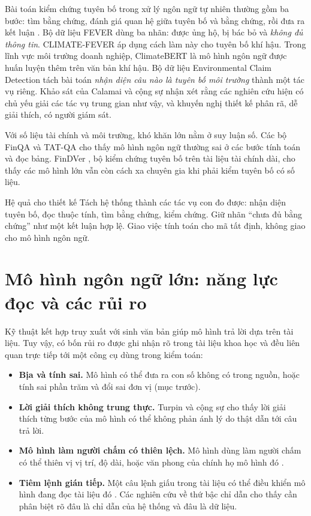 Bài toán kiểm chứng tuyên bố trong xử lý ngôn ngữ tự nhiên thường gồm ba bước: tìm bằng chứng, đánh giá quan hệ giữa tuyên bố và bằng chứng, rồi đưa ra kết luận \cite{guo2022survey}. Bộ dữ liệu FEVER \cite{thorne2018} dùng ba nhãn: được ủng hộ, bị bác bỏ và \emph{không đủ thông tin}. CLIMATE-FEVER \cite{diggelmann2020} áp dụng cách làm này cho tuyên bố khí hậu. Trong lĩnh vực môi trường doanh nghiệp, ClimateBERT \cite{webersinke2022} là mô hình ngôn ngữ được huấn luyện thêm trên văn bản khí hậu. Bộ dữ liệu Environmental Claim Detection \cite{stammbach2023} tách bài toán \emph{nhận diện câu nào là tuyên bố môi trường} thành một tác vụ riêng. Khảo sát của Calamai và cộng sự \cite{calamai2025} nhận xét rằng các nghiên cứu hiện có chủ yếu giải các tác vụ trung gian như vậy, và khuyến nghị thiết kế phân rã, dễ giải thích, có người giám sát.

Với số liệu tài chính và môi trường, khó khăn lớn nằm ở suy luận số. Các bộ FinQA \cite{chen2021finqa} và TAT-QA \cite{zhu2021tatqa} cho thấy mô hình ngôn ngữ thường sai ở các bước tính toán và đọc bảng. FinDVer \cite{zhao2024findver}, bộ kiểm chứng tuyên bố trên tài liệu tài chính dài, cho thấy các mô hình lớn vẫn còn cách xa chuyên gia khi phải kiểm tuyên bố có số liệu.

\begin{hopy}{Hệ quả cho thiết kế}
Tách hệ thống thành các tác vụ con đo được: nhận diện tuyên bố, đọc thuộc tính, tìm bằng chứng, kiểm chứng. Giữ nhãn “chưa đủ bằng chứng” như một kết luận hợp lệ. Giao việc tính toán cho mã tất định, không giao cho mô hình ngôn ngữ.
\end{hopy}

\section{Mô hình ngôn ngữ lớn: năng lực đọc và các rủi ro}

Kỹ thuật kết hợp truy xuất với sinh văn bản \cite{lewis2020rag} giúp mô hình trả lời dựa trên tài liệu. Tuy vậy, có bốn rủi ro được ghi nhận rõ trong tài liệu khoa học và đều liên quan trực tiếp tới một công cụ dùng trong kiểm toán:

\begin{itemize}
\item \textbf{Bịa và tính sai.} Mô hình có thể đưa ra con số không có trong nguồn, hoặc tính sai phần trăm và đổi sai đơn vị (mục trước).
\item \textbf{Lời giải thích không trung thực.} Turpin và cộng sự \cite{turpin2023} cho thấy lời giải thích từng bước của mô hình có thể không phản ánh lý do thật dẫn tới câu trả lời.
\item \textbf{Mô hình làm người chấm có thiên lệch.} Mô hình dùng làm người chấm có thể thiên vị vị trí, độ dài, hoặc văn phong của chính họ mô hình đó \cite{zheng2023judge,wang2024fair}.
\item \textbf{Tiêm lệnh gián tiếp.} Một câu lệnh giấu trong tài liệu có thể điều khiển mô hình đang đọc tài liệu đó \cite{greshake2023}. Các nghiên cứu về thứ bậc chỉ dẫn \cite{wallace2024} cho thấy cần phân biệt rõ đâu là chỉ dẫn của hệ thống và đâu là dữ liệu.
\end{itemize}

